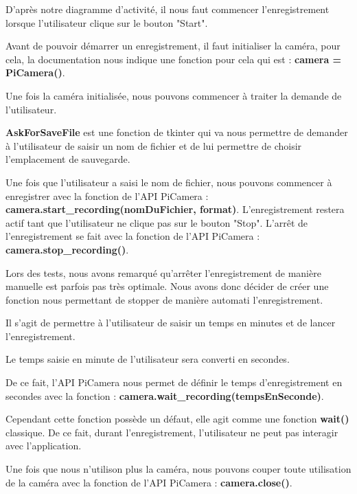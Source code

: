             \begin{flushleft}
                D'après notre diagramme d'activité, il nous faut commencer l'enregistrement lorsque l'utilisateur clique sur le bouton "Start".

                \vspace{0.2cm}

                Avant de pouvoir démarrer un enregistrement, il faut initialiser la caméra, pour cela, la documentation nous indique une fonction pour cela qui est : \textbf{camera = PiCamera()}.

                Une fois la caméra initialisée, nous pouvons commencer à traiter la demande de l'utilisateur.

                
                \textbf{AskForSaveFile} est une fonction de tkinter qui va nous permettre de demander à l'utilisateur de saisir un nom de fichier et de lui permettre de choisir l'emplacement de sauvegarde.

                \vspace{0.2cm}

                Une fois que l'utilisateur a saisi le nom de fichier, nous pouvons commencer à enregistrer avec la fonction de l'API PiCamera : \textbf{camera.start\_recording(nomDuFichier, format)}.
                L'enregistrement restera actif tant que l'utilisateur ne clique pas sur le bouton "Stop".
                L'arrêt de l'enregistrement se fait avec la fonction de l'API PiCamera : \textbf{camera.stop\_recording()}.

                \vspace{0.2cm}
                Lors des tests, nous avons remarqué qu'arrêter l'enregistrement de manière manuelle est parfois pas très optimale.
                Nous avons donc décider de créer une fonction nous permettant de stopper de manière automati l'enregistrement.

                \vspace{0.2cm}

                Il s'agit de permettre à l'utilisateur de saisir un temps en minutes et de lancer l'enregistrement.

                \vspace{0.2cm}

                Le temps saisie en minute de l'utilisateur sera converti en secondes.

                De ce fait, l'API PiCamera nous permet de définir le temps d'enregistrement en secondes avec la fonction : \textbf{camera.wait\_recording(tempsEnSeconde)}.
                
                \vspace{0.2cm}

                Cependant cette fonction possède un défaut, elle agit comme une fonction \textbf{wait()} classique. De ce fait, durant l'enregistrement, l'utilisateur ne peut pas interagir avec l'application.

                Une fois que nous n'utilison plus la caméra, nous pouvons couper toute utilisation de la caméra avec la fonction de l'API PiCamera : \textbf{camera.close()}.

            \end{flushleft}


